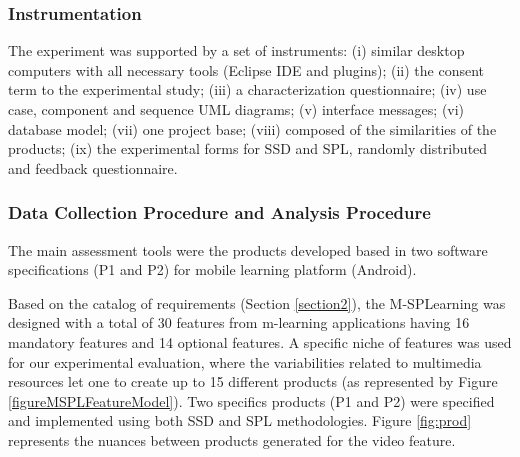 \subsubsection{Instrumentation}

The experiment was supported by a set of instruments: (i) similar desktop computers with all necessary tools (Eclipse IDE and plugins); (ii) the consent term to the experimental study; (iii) a characterization questionnaire; (iv) use case, component and sequence UML diagrams; (v) interface messages; (vi) database model; (vii) one project base; (viii) composed of the similarities of the products; (ix) the experimental forms for SSD and SPL, randomly distributed and feedback questionnaire.

\subsubsection{Data Collection Procedure and Analysis Procedure}



The main assessment tools were the products developed based in two software specifications (P1 and P2) for mobile learning platform (Android).

Based on the catalog of requirements (Section \ref{section2}), the M-SPLearning was designed with a total of 30 features from m-learning applications having 16 mandatory features and 14 optional features. A specific niche of features was used for our experimental evaluation, where the variabilities related to multimedia resources let one to create up to 15 different products (as represented by Figure \ref{figureMSPLFeatureModel}). Two specifics products (P1 and P2) were specified and implemented using both SSD and SPL methodologies. Figure \ref{fig:prod} represents the nuances between products generated for the video feature.


